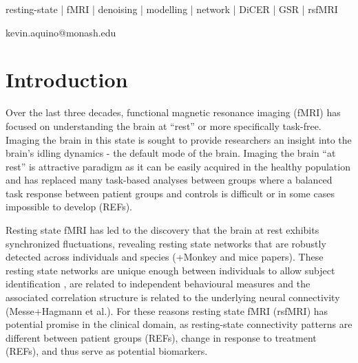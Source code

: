 \documentclass[oneside]{zHenriquesLab-StyleBioRxiv}
\begin{document}
\begin{keywords}
resting-state | fMRI | denoising | modelling | network | DiCER | GSR | rsfMRI
\end{keywords}

\begin{corrauthor}
kevin.aquino@monash.edu
\end{corrauthor}


\section*{Introduction}






Over the last three decades, functional magnetic resonance imaging (fMRI) has  focused on understanding the brain at ``rest'' or more specifically task-free. Imaging the brain in this state is sought to provide researchers an insight into the brain's idling dynamics - the default mode of the brain. Imaging the brain ``at rest'' is attractive paradigm as it can be easily acquired in the healthy population and has replaced many task-based analyses between groups where a balanced task response between patient groups and controls is difficult or in some cases impossible to develop (REFs).


Resting state fMRI has led to the discovery that the brain at rest exhibits synchronized fluctuations, revealing resting state networks \cite{fox2005human} that are robustly detected across individuals and species \cite{smith2009correspondence,beckmann2004probabilistic} (+Monkey and mice papers). These resting state networks are unique enough between individuals to allow subject identification \cite{finn2015functional,amico2018quest}, are related to independent behavioural measures \cite{li2019global} and the associated correlation structure is related to the underlying neural connectivity (Messe+Hagmann et al.). For these reasons resting state fMRI (rsfMRI) has potential promise in the clinical domain, as resting-state connectivity patterns are different between patient groups (REFs), change in response to treatment (REFs), and thus serve as potential biomarkers. 
\end{document}
